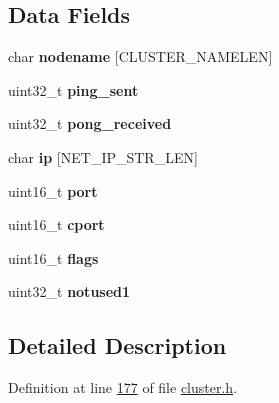 \subsection*{Data Fields}
\begin{DoxyCompactItemize}
\item 
\mbox{\label{structclusterMsgDataGossip_a382a71f82a25f5db3d72cc157e5e7df7}} 
char {\bfseries nodename} \mbox{[}C\+L\+U\+S\+T\+E\+R\+\_\+\+N\+A\+M\+E\+L\+EN\mbox{]}
\item 
\mbox{\label{structclusterMsgDataGossip_afca2b0fa134954fc8e0652a1e35eaa35}} 
uint32\+\_\+t {\bfseries ping\+\_\+sent}
\item 
\mbox{\label{structclusterMsgDataGossip_acd8f681b7d76d00bf70d27b1130c97df}} 
uint32\+\_\+t {\bfseries pong\+\_\+received}
\item 
\mbox{\label{structclusterMsgDataGossip_ad1f61e0cc5f9be1db6aa4cd7c85c554a}} 
char {\bfseries ip} \mbox{[}N\+E\+T\+\_\+\+I\+P\+\_\+\+S\+T\+R\+\_\+\+L\+EN\mbox{]}
\item 
\mbox{\label{structclusterMsgDataGossip_a6a38835f189c60b4c9ea9be5c817e6af}} 
uint16\+\_\+t {\bfseries port}
\item 
\mbox{\label{structclusterMsgDataGossip_a2e1abb299507da7c3f6b56235a9ad1f5}} 
uint16\+\_\+t {\bfseries cport}
\item 
\mbox{\label{structclusterMsgDataGossip_ad1ca60d86c831ae3592f10f1632c71e1}} 
uint16\+\_\+t {\bfseries flags}
\item 
\mbox{\label{structclusterMsgDataGossip_a84dfb60c8d76dc947d5940c18d290403}} 
uint32\+\_\+t {\bfseries notused1}
\end{DoxyCompactItemize}


\subsection{Detailed Description}


Definition at line \hyperlink{cluster_8h_source_l00177}{177} of file \hyperlink{cluster_8h_source}{cluster.\+h}.



